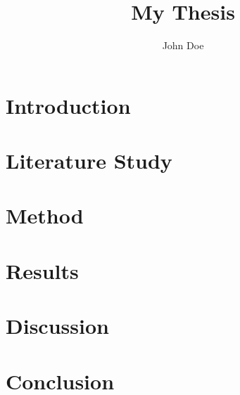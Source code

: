 \documentclass[10pt,b5paper,twoside,openright]{book}
\begin{document}
\def\mytitle{My Thesis}
\title{\mytitle}

\def\myauthor{John Doe}
\author{\myauthor}

%


\frontmatter
\pagestyle{plain}
\begingroup
\let\cleardoublepage\clearpage




\tableofcontents \clearpage
\listoftables    \clearpage
\listoffigures   \clearpage
\endgroup

\mainmatter{}
\pagestyle{headings}

\chapter{Introduction}\label{ch:introduction}


\chapter{Literature Study}\label{ch:literature-study}


\chapter{Method}\label{ch:method}


\chapter{Results}\label{ch:results}


\chapter{Discussion}\label{ch:discussion}


\chapter{Conclusion}\label{ch:conclusion}


\begin{flushleft}
	
	
\end{flushleft}


\end{document}
